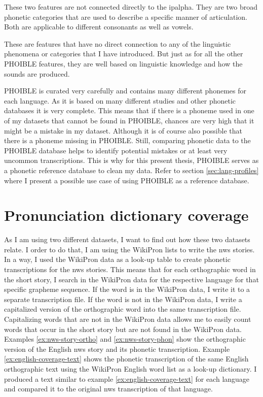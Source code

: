 \begin{description}[style=unboxed]
    \item[\textsc{continuant, sonorant}:] These two features are not connected directly to the \ac{ipalpha}. They are two broad phonetic categories that are used to describe a specific manner of articulation. Both are applicable to different consonants as well as vowels.
    
    \item[\textsc{spreadGlottis, constrictedGlottis, delayedRelease, strident, distributed, tense, fortis, periodicGlottalSource, epilaryngealSource}:] These are features that have no direct connection to any of the linguistic phenomena or categories that I have introduced. But just as for all the other PHOIBLE features, they are well based on linguistic knowledge and how the sounds are produced.
\end{description}


PHOIBLE is curated very carefully and contains many different phonemes for each language. As it is based on many different studies and other phonetic databases it is very complete. This means that if there is a phoneme used in one of my datasets that cannot be found in PHOIBLE, chances are very high that it might be a mistake in my dataset. Although it is of course also possible that there is a phoneme missing in PHOIBLE. Still, comparing phonetic data to the PHOIBLE database helps to identify potential mistakes or at least very uncommon transcriptions. This is why for this present thesis, PHOIBLE serves as a phonetic reference database to clean my data. Refer to section \ref{sec:lang-profiles} where I present a possible use case of using PHOIBLE as a reference database.

\section{Pronunciation dictionary coverage}
\label{sec:coverage}
As I am using two different datasets, I want to find out how these two datasets relate. I order to do that, I am using the WikiPron lists to write the \ac{nws} stories. In a way, I used the WikiPron data as a look-up table to create phonetic transcriptions for the \ac{nws} stories. This means that for each orthographic word in the short story, I search in the WikiPron data for the respective language for that specific grapheme sequence. If the word is in the WikiPron data, I write it to a separate transcription file. If the word is not in the WikiPron data, I write a capitalized version of the orthographic word into the same transcription file. Capitalizing words that are not in the WikiPron data allows me to easily count words that occur in the short story but are not found in the WikiPron data. Examples \ref{ex:nws-story-ortho} and \ref{ex:nws-story-phon} show the orthographic version of the English \ac{nws} story and its phonetic transcription. Example \ref{ex:english-coverage-text} shows the phonetic transcription of the same English orthographic text using the WikiPron English word list as a look-up dictionary. I produced a text similar to example \ref{ex:english-coverage-text} for each language and compared it to the original \ac{nws} transcription of that language.

